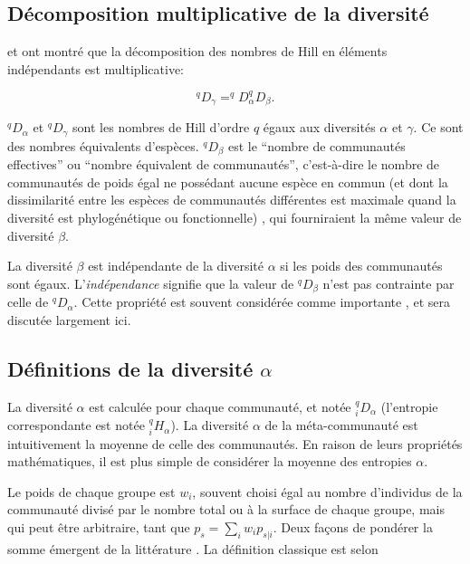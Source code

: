 \documentclass[
  11pt,
  french,
  a4paper,
  extrafontsizes,onecolumn,openright
  ]{memoir}
\newlength{\rf}
\begin{document}
\subsection{Décomposition multiplicative de la diversité}\label{duxe9composition-multiplicative-de-la-diversituxe9}

\textcite{Jost2007} et \textcite{Chao2012a} ont montré que la décomposition des nombres de Hill en éléments indépendants est multiplicative:

\begin{equation}
  \label{eq:DecompDq}
  ^{q}\!D_{\gamma} = ^{q}\!D_{\alpha} ^{q}\!D_{\beta}.
\end{equation}

\(^{q}\!D_{\alpha}\) et \(^{q}\!D_{\gamma}\) sont les nombres de Hill d'ordre \(q\) égaux aux diversités \(\alpha\) et \(\gamma\).
Ce sont des nombres équivalents d'espèces.
\(^{q}\!D_{\beta}\) est le ``nombre de communautés effectives'' ou ``nombre équivalent de communautés'', c'est-à-dire le nombre de communautés de poids égal ne possédant aucune espèce en commun (et dont la dissimilarité entre les espèces de communautés différentes est maximale quand la diversité est phylogénétique ou fonctionnelle) \autocite{Pavoine2015a}, qui fourniraient la même valeur de diversité \(\beta\).

La diversité \(\beta\) est indépendante de la diversité \(\alpha\) si les poids des communautés sont égaux.
L'\emph{indépendance} signifie que la valeur de \(^{q}\!D_{\beta}\) n'est pas contrainte par celle de \(^{q}\!D_{\alpha}\).
Cette propriété est souvent considérée comme importante \autocite{Wilson1984,Gregorius2010}, et sera discutée largement ici.

\subsection{\texorpdfstring{Définitions de la diversité \(\alpha\)}{Définitions de la diversité \textbackslash alpha}}\label{sec-defalpha}

La diversité \(\alpha\) est calculée pour chaque communauté, et notée \(^q_iD_{\alpha}\) (l'entropie correspondante est notée \(^{q}_{i}\!H_{\alpha}\)).
La diversité \(\alpha\) de la méta-communauté est intuitivement la moyenne de celle des communautés.
En raison de leurs propriétés mathématiques, il est plus simple de considérer la moyenne des entropies \(\alpha\).

Le poids de chaque groupe est \(w_i\), souvent choisi égal au nombre d'individus de la communauté divisé par le nombre total ou à la surface de chaque groupe, mais qui peut être arbitraire, tant que \(p_s=\sum_i{w_i p_{s|i}}\).
Deux façons de pondérer la somme émergent de la littérature \autocite{Chao2012a}.
La définition classique est selon \textcite{Routledge1979}
\end{document}
